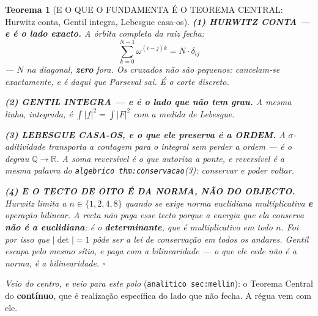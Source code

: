 \documentclass[11pt,a4paper]{article}
\newcommand{\code}[1]{\texttt{\small #1}}
\newtheorem{teorema}{Teorema}
\newcommand{\abs}[1]{\lvert #1\rvert}
\begin{document}
\begin{teorema}[E O QUE O FUNDAMENTA É O TEOREMA CENTRAL: Hurwitz conta, Gentil integra,
Lebesgue casa-os]
\textbf{(1) HURWITZ CONTA --- e é o lado exacto.} A órbita completa da raiz fecha:
\[
\boxed{\;\sum_{k=0}^{N-1}\omega^{(i-j)k}=N\cdot\delta_{ij}\;}
\]
--- $N$ na diagonal, \textbf{zero} fora. Os cruzados não são pequenos: cancelam-se
\emph{exactamente}, e é daqui que Parseval sai. \emph{É o corte discreto.}

\textbf{(2) GENTIL INTEGRA --- e é o lado que não tem grau.} A mesma linha, integrada,
é $\int\abs{f}^{2}=\int\abs{F}^{2}$ com a medida de Lebesgue.

\textbf{(3) LEBESGUE CASA-OS, e o que ele preserva é a ORDEM.} A $\sigma$-aditividade
transporta a contagem para o integral \emph{sem perder a ordem} --- é o degrau
$\mathbb{Q}\to\mathbb{R}$. \emph{A soma reversível é o que autoriza a ponte}, e
reversível é a mesma palavra do \code{algebrico thm:conservacao}(3): conservar e poder voltar.

\textbf{(4) E O TECTO DE OITO É DA NORMA, NÃO DO OBJECTO.} Hurwitz limita a
$n\in\{1,2,4,8\}$ quando se exige norma \emph{euclidiana} multiplicativa \textbf{e}
operação bilinear. A recta não paga esse tecto porque a energia que ela conserva
\textbf{não é a euclidiana}: é o \textbf{determinante}, que é multiplicativo em todo $n$.
\emph{Foi por isso que $\abs{\det}=1$ pôde ser a lei de conservação em todos os andares.}
Gentil escapa pelo mesmo sítio, e paga com a bilinearidade --- \emph{o que ele cede não é
a norma, é a bilinearidade}. $\square$
\end{teorema}

\noindent\emph{Veio do centro, e veio para este polo} (\code{analitico sec:mellin}): o
Teorema Central do \textbf{contínuo}, que é realização específica do lado que não fecha.
A régua vem com ele.
\end{document}
